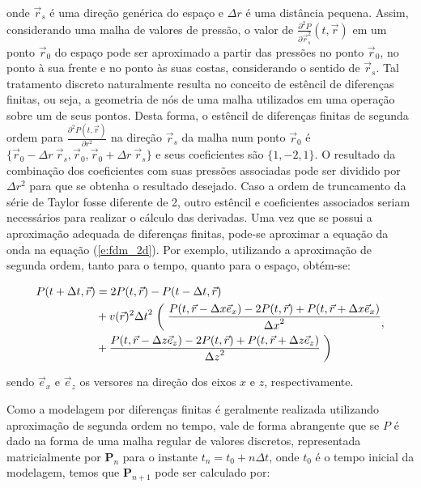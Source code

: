     \noindent onde $\vec{r}_s$ é uma direção genérica do espaço e $\Delta r$ é uma distância pequena. Assim, considerando uma malha de valores de pressão, o valor de $\frac{\partial^2 P}{\partial\vec{r}_s^2}(t,\vec{r})$ em um ponto $\vec{r}_0$ do espaço pode ser aproximado a partir das pressões no ponto $\vec{r}_0$, no ponto à sua frente e no ponto às suas costas, considerando o sentido de $\vec{r}_s$. Tal tratamento discreto naturalmente resulta no conceito de estêncil de diferenças finitas, ou seja, a geometria de nós de uma malha utilizados em uma operação sobre um de seus pontos. Desta forma, o estêncil de diferenças finitas de segunda ordem para $\frac{\partial^2 P(t,\vec{r})}{\partial r^2}$ na direção $\vec{r}_s$ da malha num ponto $\vec{r}_0$ é $\{\vec{r}_0 - {\Delta r}\ \vec{r}_s, \vec{r}_0, \vec{r}_0+{\Delta r}\ \vec{r}_s\}$ e seus coeficientes são $\{1, -2, 1\}$. O resultado da combinação dos coeficientes com suas pressões associadas pode ser dividido por $\Delta r^2$ para que se obtenha o resultado desejado. Caso a ordem de truncamento da série de Taylor fosse diferente de 2, outro estêncil e coeficientes associados seriam necessários para realizar o cálculo das derivadas. Uma vez que se possui a aproximação adequada de diferenças finitas, pode-se aproximar a equação da onda na equação (\ref{e:fdm_2d}). Por exemplo, utilizando a aproximação de segunda ordem, tanto para o tempo, quanto para o espaço, obtém-se:

    \begin{equation} \label{e:fdm_2d_ordem_2}
      \begin{split}
        P(t+\Delta t,\vec{r}) & =  2 P(t,\vec{r}) - P(t-\Delta t,\vec{r}) \\
          & + v(\vec{r})^2 {\Delta t}^2 \biggm( \frac{P(t, \vec{r}-{\Delta x} \vec{e}_x) - 2P(t, \vec{r}) + P(t, \vec{r}+{\Delta x}\vec{e}_x)}{{\Delta x}^2} \\
          & + \frac{P(t,\vec{r}-{\Delta z} \vec{e}_z)-2P(t,\vec{r})+P(t, \vec{r}+{\Delta z} \vec{e}_z)}{{\Delta z}^2} \biggm)
      \end{split},  %
    \end{equation}

    \noindent sendo $\vec{e}_x$ e $\vec{e}_z$ os versores na direção dos eixos $x$ e $z$, respectivamente.

    Como a modelagem por diferenças finitas é geralmente realizada utilizando aproximação de segunda ordem no tempo, vale de forma abrangente que se $P$ é dado na forma de uma malha regular de valores discretos, representada matricialmente por $\boldsymbol{P}_{n}$ para o instante $t_n=t_0+n\Delta t$, onde $t_0$ é o tempo inicial da modelagem, temos que $\boldsymbol{P}_{n+1}$ pode ser calculado por:

